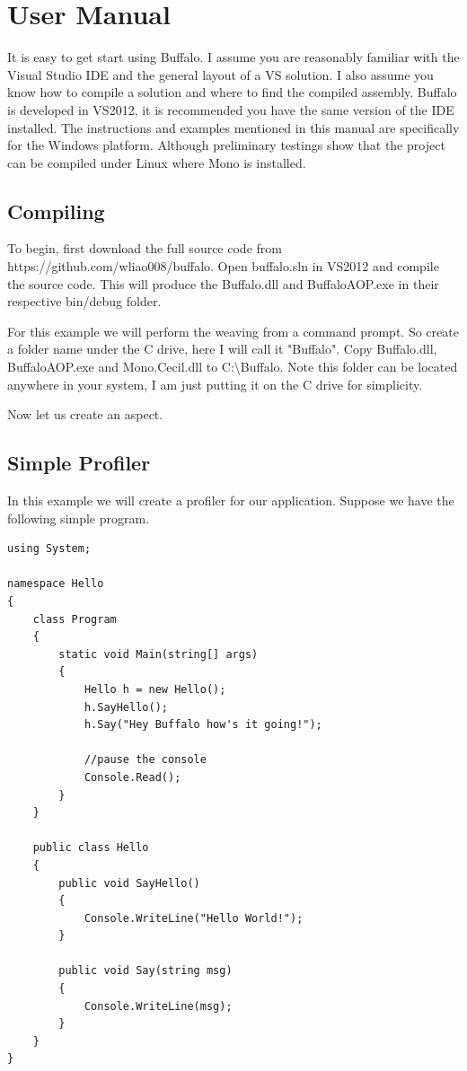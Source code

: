 \chapter{User Manual}

It is easy to get start using Buffalo. I assume you are reasonably familiar with the Visual Studio IDE and the general layout of a VS solution. I also assume you know how to compile a solution and where to find the compiled assembly. Buffalo is developed in VS2012, it is recommended you have the same version of the IDE installed. The instructions and examples mentioned in this manual are specifically for the Windows platform. Although preliminary testings show that the project can be compiled under Linux where Mono is installed. 

\section{Compiling}
To begin, first download the full source code from https://github.com/wliao008/buffalo. Open buffalo.sln in VS2012 and compile the source code. This will produce the Buffalo.dll and BuffaloAOP.exe in their respective bin/debug folder.

For this example we will perform the weaving from a command prompt. So create a folder name under the C drive, here I will call it "Buffalo". Copy Buffalo.dll, BuffaloAOP.exe and Mono.Cecil.dll to C:\textbackslash{Buffalo}. Note this folder can be located anywhere in your system, I am just putting it on the C drive for simplicity.

Now let us create an aspect.

\section{Simple Profiler}
In this example we will create a profiler for our application. Suppose we have the following simple program.

\begin{lstlisting}[caption={Hello program}, label=helloprogram, frame=tb, basicstyle=\scriptsize]
using System;

namespace Hello
{
    class Program
    {
        static void Main(string[] args)
        {
            Hello h = new Hello();
            h.SayHello();
            h.Say("Hey Buffalo how's it going!");

            //pause the console
            Console.Read();
        }
    }

    public class Hello
    {
        public void SayHello()
        {
            Console.WriteLine("Hello World!");
        }

        public void Say(string msg)
        {
            Console.WriteLine(msg);
        }
    }
}
\end{lstlisting}

